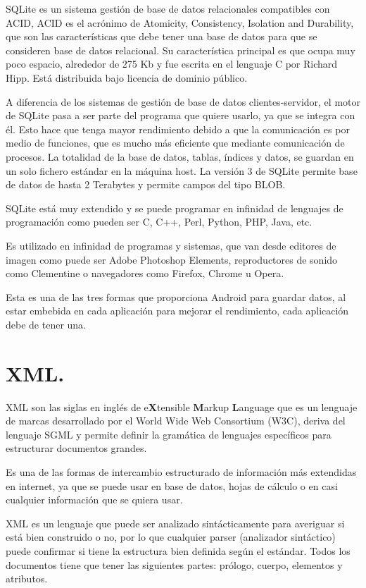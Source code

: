 SQLite es un sistema gestión de base de datos relacionales compatibles con ACID, ACID es el acrónimo de Atomicity, Consistency, Isolation and Durability, que son las características que debe tener una base de datos para que se consideren base de datos relacional. Su característica principal es que ocupa muy poco espacio, alrededor de 275 Kb y fue escrita en el lenguaje C por Richard Hipp. Está distribuida bajo licencia de dominio público.

A diferencia de los sistemas de gestión de base de datos clientes-servidor, el motor de SQLite pasa a ser parte del programa que quiere usarlo, ya que se integra con él. Esto hace que tenga mayor rendimiento debido a que la comunicación es por medio de funciones, que es mucho más eficiente que mediante comunicación de procesos. La totalidad de la base de datos, tablas, índices y datos, se guardan en un solo fichero estándar en la máquina host. La versión 3 de SQLite permite base de datos de hasta 2 Terabytes y permite campos del tipo BLOB.

SQLite está muy extendido y se puede programar en infinidad de lenguajes de programación como pueden ser C, C++, Perl, Python, PHP, Java, etc.

Es utilizado en infinidad de programas y sistemas, que van desde editores de imagen como puede ser Adobe Photoshop Elements, reproductores de sonido como Clementine o navegadores como Firefox, Chrome u Opera.

Esta es una de las tres formas que proporciona Android para guardar datos, al estar embebida en cada aplicación para mejorar el rendimiento, cada aplicación debe de tener una. 

\section{XML.}

XML son las siglas en inglés de e\textbf{X}tensible \textbf{M}arkup \textbf{L}anguage que es un lenguaje de marcas desarrollado por el World Wide Web Consortium (W3C), deriva del lenguaje SGML y permite definir la gramática de lenguajes específicos para estructurar documentos grandes.

Es una de las formas de intercambio estructurado de información más extendidas en internet, ya que se puede usar en base de datos, hojas de cálculo o en casi cualquier información que se quiera usar.

XML es un lenguaje que puede ser analizado sintácticamente para averiguar si está bien construido o no, por lo que cualquier parser (analizador sintáctico) puede confirmar si tiene la estructura bien definida según el estándar. Todos los documentos tiene que tener las siguientes partes: prólogo, cuerpo, elementos y atributos.

